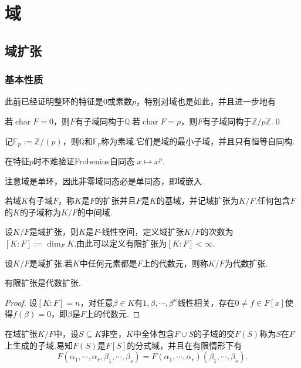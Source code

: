 \chapter{域}
\section{域扩张}
\subsection{基本性质}
此前已经证明整环的特征是$0$或素数$p$，特别对域也是如此，并且进一步地有
\begin{prop}
    若$\operatorname*{char}F=0$，则$F$有子域同构于$\mathbb{Q}$.若$\operatorname*{char}F=p$，则$F$有子域同构于$\mathbb{Z}/p\mathbb{Z}$.\qed
\end{prop}

记$\mathbb{F}_p:=\mathbb{Z}/(p)$，则$\mathbb{Q}$和$\mathbb{F}_p$称为{\heiti 素域}.它们是域的最小子域，并且只有恒等自同构.

在特征$p$时不难验证{\heiti Frobenius自同态} $x\mapsto x^p$.

\begin{remark}
    注意域是单环，因此非零域同态必是单同态，即域嵌入.
\end{remark}

\begin{definition}
    若域$K$有子域$F$，称$K$是$F$的{\heiti 扩张}并且$F$是$K$的{\heiti 基域}，并记域扩张为$K/F$.任何包含$F$的$K$的子域称为$K/F$的{\heiti 中间域}.

    设$K/F$是域扩张，则$K$是$F$-线性空间，定义域扩张$K/F$的{\heiti 次数}为$[K:F]:=\dim_FK$.由此可以定义{\heiti 有限扩张}为$[K:F]<\infty$.

    设$K/F$是域扩张.若$K$中任何元素都是$F$上的代数元，则称$K/F$为{\heiti 代数扩张}.
\end{definition}
\begin{prop}
    有限扩张是代数扩张.
\end{prop}
\begin{proof}
    设$[K:F]=n$，对任意$\beta\in K$有$1,\beta,\cdots,\beta^n$线性相关，存在$0\ne f\in F[x]$使得$f(\beta)=0$，即$\beta$是$F$上的代数元.
\end{proof}

在域扩张$K/F$中，设$S\subseteq K$非空，$K$中全体包含$F\cup S$的子域的交$F(S)$称为$S$在$F$上{\heiti 生成}的子域.易知$F(S)$是$F[S]$的分式域，并且在有限情形下有
\[
    F(\alpha_1,\cdots,\alpha_r,\beta_1,\cdots,\beta_s)=F(\alpha_1,\cdots,\alpha_r)(\beta_1,\cdots,\beta_s).
\]

